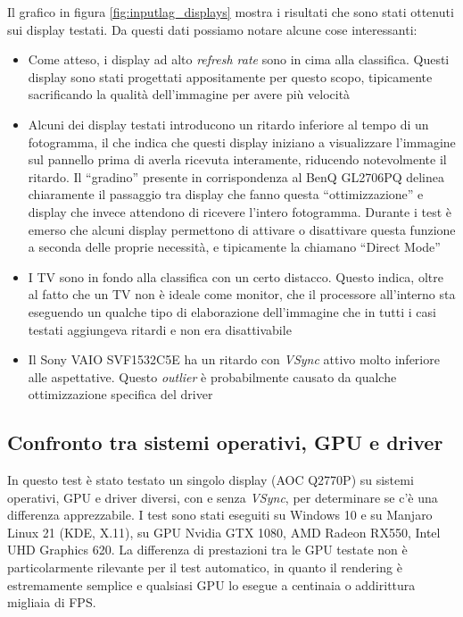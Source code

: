 Il grafico in figura \ref{fig:inputlag_displays} mostra i risultati che sono stati ottenuti sui display testati. Da questi dati possiamo notare alcune cose interessanti:\begin{itemize}
	\item Come atteso, i display ad alto \textit{refresh rate} sono in cima alla classifica. Questi display sono stati progettati appositamente per questo scopo, tipicamente sacrificando la qualità dell'immagine per avere più velocità
	\item Alcuni dei display testati introducono un ritardo inferiore al tempo di un fotogramma, il che indica che questi display iniziano a visualizzare l'immagine sul pannello prima di averla ricevuta interamente, riducendo notevolmente il ritardo. Il ``gradino'' presente in corrispondenza al BenQ GL2706PQ delinea chiaramente il passaggio tra display che fanno questa ``ottimizzazione'' e display che invece attendono di ricevere l'intero fotogramma. Durante i test è emerso che alcuni display permettono di attivare o disattivare questa funzione a seconda delle proprie necessità, e tipicamente la chiamano ``Direct Mode''
	\item I TV sono in fondo alla classifica con un certo distacco. Questo indica, oltre al fatto che un TV non è ideale come monitor, che il processore all'interno sta eseguendo un qualche tipo di elaborazione dell'immagine che in tutti i casi testati aggiungeva ritardi e non era disattivabile
	\item Il Sony VAIO SVF1532C5E ha un ritardo con \textit{VSync} attivo molto inferiore alle aspettative. Questo \textit{outlier} è probabilmente causato da qualche ottimizzazione specifica del driver
\end{itemize}

\subsection{Confronto tra sistemi operativi, GPU e driver}
In questo test è stato testato un singolo display (AOC Q2770P) su sistemi operativi, GPU e driver diversi, con e senza \textit{VSync}, per determinare se c'è una differenza apprezzabile. I test sono stati eseguiti su Windows 10 e su Manjaro Linux 21 (KDE, X.11), su GPU Nvidia GTX 1080, AMD Radeon RX550, Intel UHD Graphics 620. La differenza di prestazioni tra le GPU testate non è particolarmente rilevante per il test automatico, in quanto il rendering è estremamente semplice e qualsiasi GPU lo esegue a centinaia o addirittura migliaia di FPS.

